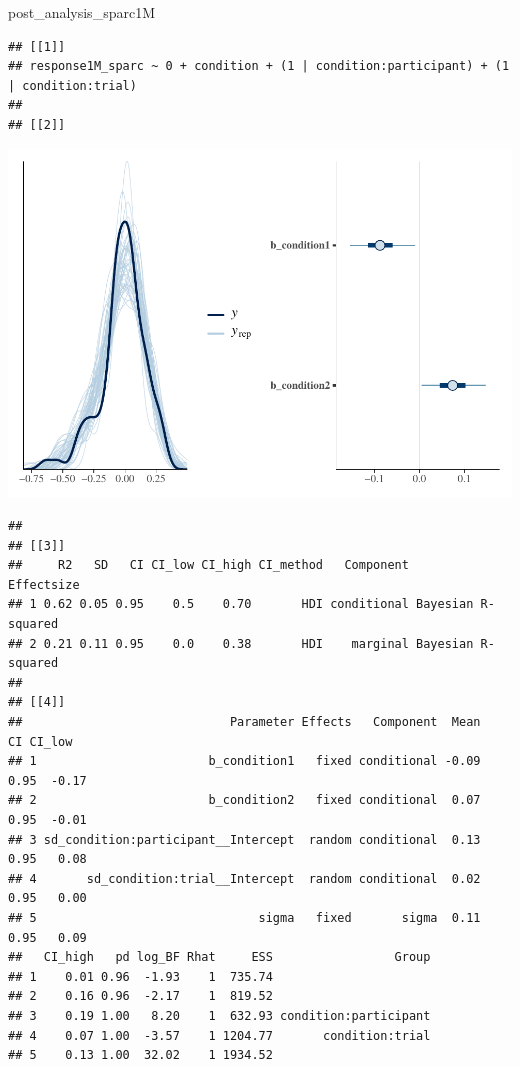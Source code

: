 \documentclass[
]{article}
\newenvironment{Shaded}{\begin{snugshade}}{\end{snugshade}}
\newcommand{\NormalTok}[1]{#1}
\begin{document}
\begin{Shaded}
\begin{Highlighting}[]
\NormalTok{post\_analysis\_sparc1M}
\end{Highlighting}
\end{Shaded}

\begin{verbatim}
## [[1]]
## response1M_sparc ~ 0 + condition + (1 | condition:participant) + (1 | condition:trial) 
## 
## [[2]]
\end{verbatim}

\includegraphics{08_Publish_GUSO_ASIL_files/figure-latex/Diagnostiics1M-2.pdf}

\begin{verbatim}
## 
## [[3]]
##     R2   SD   CI CI_low CI_high CI_method   Component         Effectsize
## 1 0.62 0.05 0.95    0.5    0.70       HDI conditional Bayesian R-squared
## 2 0.21 0.11 0.95    0.0    0.38       HDI    marginal Bayesian R-squared
## 
## [[4]]
##                             Parameter Effects   Component  Mean   CI CI_low
## 1                        b_condition1   fixed conditional -0.09 0.95  -0.17
## 2                        b_condition2   fixed conditional  0.07 0.95  -0.01
## 3 sd_condition:participant__Intercept  random conditional  0.13 0.95   0.08
## 4       sd_condition:trial__Intercept  random conditional  0.02 0.95   0.00
## 5                               sigma   fixed       sigma  0.11 0.95   0.09
##   CI_high   pd log_BF Rhat     ESS                 Group
## 1    0.01 0.96  -1.93    1  735.74                      
## 2    0.16 0.96  -2.17    1  819.52                      
## 3    0.19 1.00   8.20    1  632.93 condition:participant
## 4    0.07 1.00  -3.57    1 1204.77       condition:trial
## 5    0.13 1.00  32.02    1 1934.52
\end{verbatim}
\end{document}
